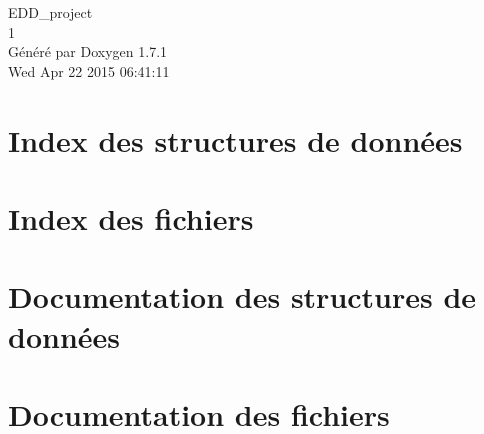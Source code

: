 \documentclass[a4paper]{book}
\begin{document}
\hypersetup{pageanchor=false}
\begin{titlepage}
\vspace*{7cm}
\begin{center}
{\Large EDD\_\-project \\[1ex]\large 1 }\\
\vspace*{1cm}
{\large Généré par Doxygen 1.7.1}\\
\vspace*{0.5cm}
{\small Wed Apr 22 2015 06:41:11}\\
\end{center}
\end{titlepage}
\clearemptydoublepage
{}
\tableofcontents
\clearemptydoublepage
{}
\hypersetup{pageanchor=true}
\chapter{Index des structures de données}

\chapter{Index des fichiers}

\chapter{Documentation des structures de données}






\chapter{Documentation des fichiers}















\printindex
\end{document}
